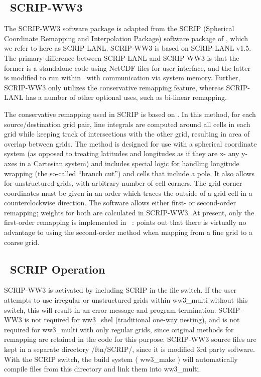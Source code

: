 \vssub
\subsection{~SCRIP-WW3} \label{sec:scripB}
\vssub

The SCRIP-WW3 software package is adapted from the {\F SCRIP} (Spherical
Coordinate Remapping and Interpolation Package) software package of
\cite{man:Jones98}, which we refer to here as SCRIP-LANL. SCRIP-WW3 is based
on SCRIP-LANL v1.5. The primary difference between SCRIP-LANL and SCRIP-WW3 is
that the former is a standalone code using NetCDF files for user interface,
and the latter is modified to run within \ws\, with communication via system
memory. Further, SCRIP-WW3 only utilizes the conservative remapping feature,
whereas SCRIP-LANL has a number of other optional uses, such as bi-linear
remapping.

The conservative remapping used in SCRIP is based on \cite{art:Jones99}. In
this method, for each source/destination grid pair, line integrals are
computed around all cells in each grid while keeping track of intersections
with the other grid, resulting in area of overlap between grids. The method is
designed for use with a spherical coordinate system (as opposed to treating
latitudes and longitudes as if they are x- any y-axes in a Cartesian system)
and includes special logic for handling longitude wrapping (the so-called
``branch cut'') and cells that include a pole. It also allows for unstructured
grids, with arbitrary number of cell corners. The grid corner coordinates must
be given in an order which traces the outside of a grid cell in a
counterclockwise direction. The software allows either first- or second-order
remapping; weights for both are calculated in SCRIP-WW3. At present, only the
first-order remapping is implemented in \ws\ : \cite{art:Jones99} points out
that there is virtually no advantage to using the second-order method when
mapping from a fine grid to a coarse grid.

\vssub
\subsection{~SCRIP Operation} \label{sec:scripC}
\vssub

SCRIP-WW3 is activated by including {\F SCRIP} in the file {\file switch}. If
the user attempts to use irregular or unstructured grids within {\file
  ww3\_multi} without this switch, this will result in an error message and
program termination. SCRIP-WW3 is not required for {\file ww3\_shel}
(traditional one-way nesting), and is not required for {\file ww3\_multi} with
only regular grids, since original methods for remapping are retained in the
code for this purpose. SCRIP-WW3 source files are kept in a separate
directory {\dir /ftn/SCRIP/}, since it is modified 3rd party software. With
the {\F SCRIP} switch, the build system ( {\file ww3\_make} ) will
automatically compile files from this directory and link them into {\file
  ww3\_multi}.

